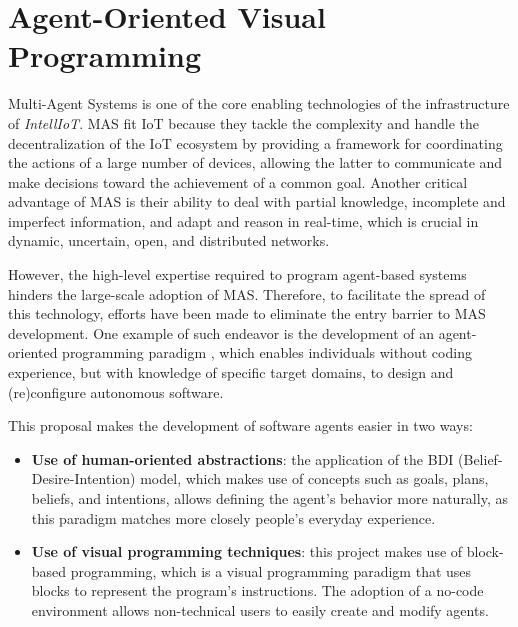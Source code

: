 \section{Agent-Oriented Visual Programming}
Multi-Agent Systems is one of the core enabling technologies of the infrastructure of \textit{IntellIoT}.
MAS fit IoT because they tackle the complexity and handle the decentralization of the IoT ecosystem by providing a framework for coordinating the actions of a large number of devices, allowing the latter to communicate and make decisions toward the achievement of a common goal.
Another critical advantage of MAS is their ability to deal with partial knowledge, incomplete and imperfect information, and adapt and reason in real-time, which is crucial in dynamic, uncertain, open, and distributed networks.

However, the high-level expertise required to program agent-based systems hinders the large-scale adoption of MAS.
Therefore, to facilitate the spread of this technology, efforts have been made to eliminate the entry barrier to MAS development.
One example of such endeavor is the development of an agent-oriented programming paradigm \cite{burattini2022agent}, which enables individuals without coding experience, but with knowledge of specific target domains, to design and (re)configure autonomous software.

This proposal makes the development of software agents easier in two ways:
\begin{itemize}
    \item \textbf{Use of human-oriented abstractions}: the application of the BDI (Belief-Desire-Intention) model, which makes use of concepts such as goals, plans, beliefs, and intentions, allows defining the agent's behavior more naturally, as this paradigm matches more closely people's everyday experience.
    \item \textbf{Use of visual programming techniques}: this project makes use of block-based programming, which is a visual programming paradigm that uses blocks to represent the program's instructions.
    The adoption of a no-code environment allows non-technical users to easily create and modify agents.
\end{itemize}

